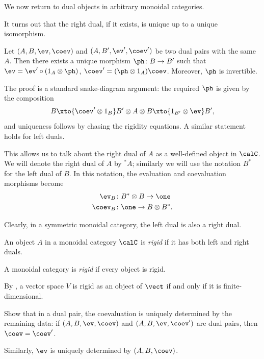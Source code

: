 We now return to dual objects in arbitrary monoidal categories.

It turns out that the right dual, if it exists, is unique up to a unique
isomorphism.
\begin{theorem}\label{t:dual_unique1}
  Let $(A, B, \ev, \coev)$ and $(A,B', \ev', \coev')$ be two dual pairs with
  the same $A$. Then there exists a unique morphism $\ph\colon B\to B'$ such
  that $\ev = \ev' \circ (1_A\otimes \ph)$, $\coev' =(\ph\otimes 1_A) \coev$.
  Moreover, $\ph$ is invertible. 
\end{theorem}
The proof is a standard snake-diagram argument: the required $\ph$ is given by
the composition
$$
  B \xto{\coev'\otimes 1_B} B'\otimes A\otimes B
    \xto{1_{B'}\otimes \ev} B',
$$
and uniqueness follows by chasing the rigidity equations.
A similar statement holds for left duals.

This allows us to talk about the right dual of $A$ as a well-defined object in
$\calC$. We will denote the right dual of $A$ by ${}^*A$; similarly we will use
the notation $B^*$ for the left dual of $B$. In this notation, the evaluation
and coevaluation morphisms become
\begin{equation}
  \begin{aligned}
    \ev_B&\colon B^*\otimes B\to\one\\
    \coev_B&\colon \one \to B\otimes B^*.
  \end{aligned}
\end{equation}

Clearly, in a symmetric monoidal
category, the left dual is also a right dual.

\begin{definition}\label{d:rigid}
  An object $A$ in a monoidal category $\calC$ is
  \emph{rigid} if
  it has both left and right duals.

  A monoidal category is \emph{rigid}
  if every object is rigid.
\end{definition}

\begin{example}\label{x:vector-rigid}
  By , a vector space $V$ is rigid as an object of
  $\vect$ if and only if it is finite-dimensional.
\end{example}


\begin{exercise}\label{ec:coev-unique}
  Show that in a dual pair, the coevaluation is uniquely determined by
  the remaining data: if $(A, B, \ev, \coev)$ and $(A,B, \ev, \coev')$
  are dual pairs, then $\coev = \coev'$.

  Similarly, $\ev$ is uniquely determined by $(A,B, \coev)$.
\end{exercise}

